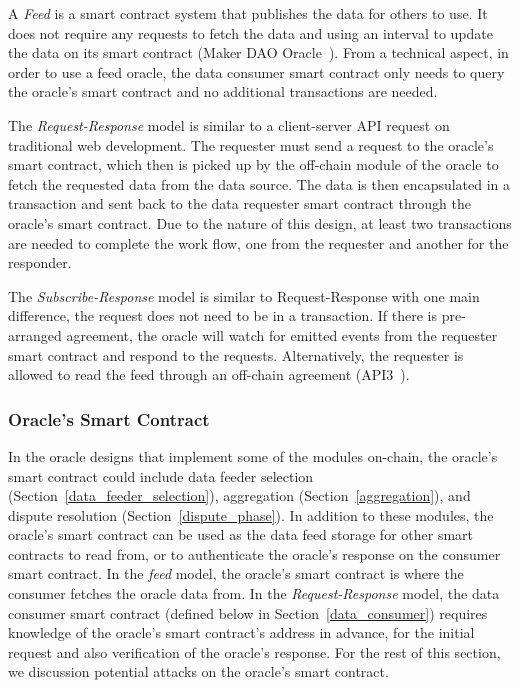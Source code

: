 A \textit{Feed} is a smart contract system that publishes the data for others to use. It does not require any requests to fetch the data and using an interval to update the data on its smart contract (\eg Maker DAO Oracle~\cite{MAKERDAOOracle}). From a technical aspect, in order to use a feed oracle, the data consumer smart contract only needs to query the oracle's smart contract and no additional transactions are needed. 

The \textit{Request-Response} model is similar to a client-server API request on traditional web development. The requester must send a request to the oracle's smart contract, which then is picked up by the off-chain module of the oracle to fetch the requested data from the data source. The data is then encapsulated in a transaction and sent back to the data requester smart contract through the oracle's smart contract. Due to the nature of this design, at least two transactions are needed to complete the work flow, one from the requester and another for the responder.

The \textit{Subscribe-Response} model is similar to Request-Response with one main difference, the request does not need to be in a transaction. If there is pre-arranged agreement, the oracle will watch for emitted events from the requester smart contract and respond to the requests. Alternatively, the requester is allowed to read the feed through an off-chain agreement (\eg API3~\cite{benligiraydecentralized}). 


\subsubsection{Oracle's Smart Contract}\label{oracle_smart_contract} 

In the oracle designs that implement some of the modules on-chain, the oracle's smart contract could include data feeder selection (Section~\ref{data_feeder_selection}), aggregation (Section~\ref{aggregation}), and dispute resolution (Section~\ref{dispute_phase}). In addition to these modules, the oracle's smart contract can be used as the data feed storage for other smart contracts to read from, or to authenticate the oracle's response on the consumer smart contract.  In the \textit{feed} model, the oracle's smart contract is where the consumer fetches the oracle data from. In the \textit{Request-Response} model, the data consumer smart contract (defined below in Section~\ref{data_consumer}) requires knowledge of the oracle's smart contract's address in advance, for the initial request and also verification of the oracle's response. For the rest of this section, we discussion potential attacks on the oracle's smart contract.

